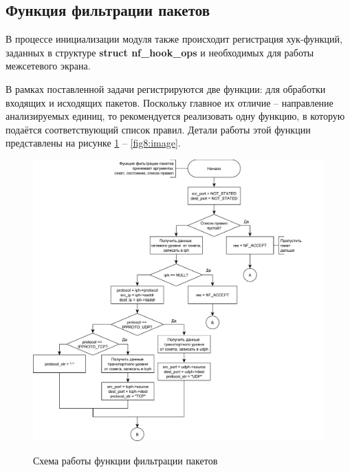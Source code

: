 \newpage

\subsection{Функция фильтрации пакетов}
В процессе инициализации модуля также происходит регистрация хук-функций, заданных в структуре \textbf{struct nf\_hook\_ops} и необходимых для работы межсетевого экрана. 

В рамках поставленной задачи регистрируются две функции: для обработки входящих и исходящих пакетов. Поскольку главное их отличие -- направление анализируемых единиц, то рекомендуется реализовать одну функцию, в которую подаётся соответствующий список правил. Детали работы этой функции представлены на рисунке \ref{fig7:image} -- \ref{fig8:image}.

\begin{figure}[h!]
	\begin{center}
		{\includegraphics[scale = 0.6]{img/filter1.pdf}}
		\caption{Схема работы функции фильтрации пакетов}
		\label{fig7:image}
	\end{center}
\end{figure}

